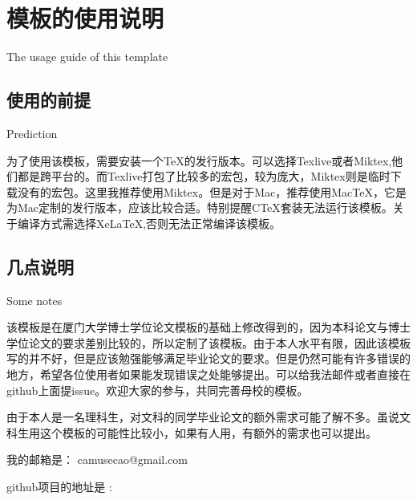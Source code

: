\chapter{模板的使用说明}{The usage guide of this template}

\section{使用的前提}{Prediction}

为了使用该模板，需要安装一个TeX的发行版本。可以选择Texlive或者Miktex,他们都是跨平台的。而Texlive打包了比较多的宏包，较为庞大，Miktex则是临时下载没有的宏包。这里我推荐使用Miktex。但是对于Mac，推荐使用MacTeX，它是为Mac定制的发行版本，应该比较合适。特别提醒CTeX套装无法运行该模板。关于编译方式需选择XeLaTeX,否则无法正常编译该模板。


\section{几点说明}{Some notes}

该模板是在厦门大学博士学位论文模板的基础上修改得到的，因为本科论文与博士学位论文的要求差别比较的，所以定制了该模板。由于本人水平有限，因此该模板写的并不好，但是应该勉强能够满足毕业论文的要求。但是仍然可能有许多错误的地方，希望各位使用者如果能发现错误之处能够提出。可以给我法邮件或者直接在github上面提issue。欢迎大家的参与，共同完善母校的模板。

由于本人是一名理科生，对文科的同学毕业论文的额外需求可能了解不多。虽说文科生用这个模板的可能性比较小，如果有人用，有额外的需求也可以提出。

我的邮箱是： camusecao@gmail.com

github项目的地址是 : 